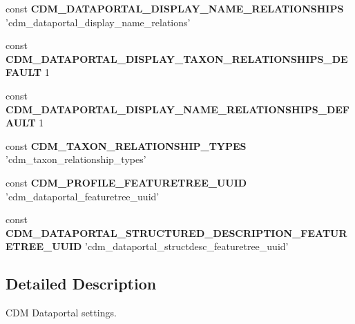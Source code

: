 \begin{DoxyCompactItemize}
\item 
\hypertarget{settings_8php_ace725e5a21b0fb90b75d0ffabe13e25d}{const {\bfseries C\-D\-M\-\_\-\-D\-A\-T\-A\-P\-O\-R\-T\-A\-L\-\_\-\-D\-I\-S\-P\-L\-A\-Y\-\_\-\-N\-A\-M\-E\-\_\-\-R\-E\-L\-A\-T\-I\-O\-N\-S\-H\-I\-P\-S} 'cdm\-\_\-dataportal\-\_\-display\-\_\-name\-\_\-relations'}\label{settings_8php_ace725e5a21b0fb90b75d0ffabe13e25d}

\item 
\hypertarget{settings_8php_affc055c8642d7048f54f338862b37267}{const {\bfseries C\-D\-M\-\_\-\-D\-A\-T\-A\-P\-O\-R\-T\-A\-L\-\_\-\-D\-I\-S\-P\-L\-A\-Y\-\_\-\-T\-A\-X\-O\-N\-\_\-\-R\-E\-L\-A\-T\-I\-O\-N\-S\-H\-I\-P\-S\-\_\-\-D\-E\-F\-A\-U\-L\-T} 1}\label{settings_8php_affc055c8642d7048f54f338862b37267}

\item 
\hypertarget{settings_8php_a0460e0f37eb814becc4f1a7129c00ede}{const {\bfseries C\-D\-M\-\_\-\-D\-A\-T\-A\-P\-O\-R\-T\-A\-L\-\_\-\-D\-I\-S\-P\-L\-A\-Y\-\_\-\-N\-A\-M\-E\-\_\-\-R\-E\-L\-A\-T\-I\-O\-N\-S\-H\-I\-P\-S\-\_\-\-D\-E\-F\-A\-U\-L\-T} 1}\label{settings_8php_a0460e0f37eb814becc4f1a7129c00ede}

\item 
\hypertarget{settings_8php_a10973eb2bdf3b0cd4c41ae948eac241e}{const {\bfseries C\-D\-M\-\_\-\-T\-A\-X\-O\-N\-\_\-\-R\-E\-L\-A\-T\-I\-O\-N\-S\-H\-I\-P\-\_\-\-T\-Y\-P\-E\-S} 'cdm\-\_\-taxon\-\_\-relationship\-\_\-types'}\label{settings_8php_a10973eb2bdf3b0cd4c41ae948eac241e}

\item 
\hypertarget{settings_8php_a41ed605bac8f103bb8fbbbb26f1fa30e}{const {\bfseries C\-D\-M\-\_\-\-P\-R\-O\-F\-I\-L\-E\-\_\-\-F\-E\-A\-T\-U\-R\-E\-T\-R\-E\-E\-\_\-\-U\-U\-I\-D} 'cdm\-\_\-dataportal\-\_\-featuretree\-\_\-uuid'}\label{settings_8php_a41ed605bac8f103bb8fbbbb26f1fa30e}

\item 
\hypertarget{settings_8php_a5046aad4f92d568fa7f7eb9264f55e40}{const {\bfseries C\-D\-M\-\_\-\-D\-A\-T\-A\-P\-O\-R\-T\-A\-L\-\_\-\-S\-T\-R\-U\-C\-T\-U\-R\-E\-D\-\_\-\-D\-E\-S\-C\-R\-I\-P\-T\-I\-O\-N\-\_\-\-F\-E\-A\-T\-U\-R\-E\-T\-R\-E\-E\-\_\-\-U\-U\-I\-D} 'cdm\-\_\-dataportal\-\_\-structdesc\-\_\-featuretree\-\_\-uuid'}\label{settings_8php_a5046aad4f92d568fa7f7eb9264f55e40}

\end{DoxyCompactItemize}


\subsection{Detailed Description}
C\-D\-M Dataportal settings. 


